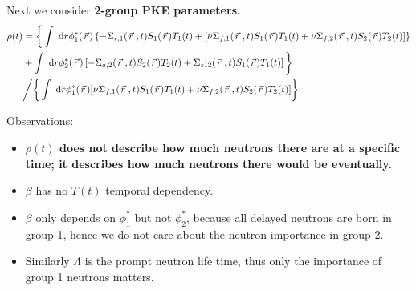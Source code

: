 \documentclass{school-22.211-notes}
\begin{document}
Next we consider \textbf{2-group PKE parameters.}
\small
\begin{align}
\rho(t) &= \bigg\{  \int \mbox{ }\mathrm{d} r  \phi_1^* (\left.\vec{r}\right.)  \left\{  - \Sigma_{r,1} (\left.\vec{r}\right.,t) S_1(\left.\vec{r}\right.) T_1(t)  + [\nu \Sigma_{f,1} (\left.\vec{r}\right., t) S_{1} (\left.\vec{r}\right.) T_{1}(t) + \nu \Sigma_{f,2} (\left.\vec{r}\right., t) S_2 (\left.\vec{r}\right.) T_2 (t)] \right\}   \notag \\ 
&+  \int \mbox{ }\mathrm{d} r  \phi_2^* (\left.\vec{r}\right.)  \left[ - \Sigma_{a,2} (\left.\vec{r}\right.,t) S_2(\left.\vec{r}\right.) T_2(t) + \Sigma_{s12} (\left.\vec{r}\right., t) S_1 (\left.\vec{r}\right.) T_1 (t)  \right]  \bigg\} \notag \\
& \bigg/
\bigg\{\int \mbox{ }\mathrm{d} r \phi_1^* (\left.\vec{r}\right.)  [\nu \Sigma_{f,1} (\left.\vec{r}\right., t) S_{1} (\left.\vec{r}\right.) T_{1}(t) + \nu \Sigma_{f,2} (\left.\vec{r}\right., t) S_2 (\left.\vec{r}\right.) T_2 (t)] \bigg\} 
\end{align}

\normalsize
{}

Observations:
\begin{itemize}
\item \textbf{$\rho(t)$ does not describe how much neutrons there are at a specific time; it describes how much neutrons there would be eventually.} 
\item $\beta$ has no $T(t)$ temporal dependency. 
\item $\beta$ only depends on $\phi_1^*$ but not $\phi_2^*$, because all delayed neutrons are born in group 1, hence we do not care about the neutron importance in group 2. 
\item Similarly $\Lambda$ is the prompt neutron life time, thus only the importance of group 1 neutrons matters. 
\end{itemize}
\end{document}
